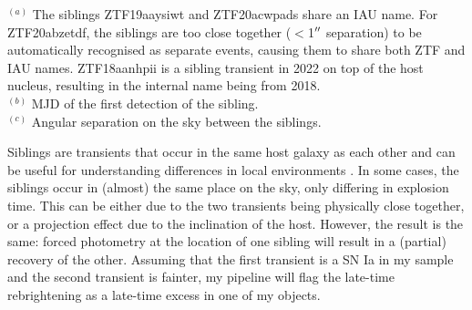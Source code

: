 \documentclass[a4paper,oneside,12pt, class=Latex/Classes/PhDthesisPSnPDF, crop=false]{standalone}
\begin{document}
\begin{table}
 \centering
 \caption{Objects with a detected sibling transient.}
 \begin{flushleft}
$^{(a)}$ The siblings ZTF19aaysiwt and ZTF20acwpads share an IAU name. For ZTF20abzetdf, the siblings are too close together ($<$1$^{\prime\prime}$ separation) to be automatically recognised as separate events, causing them to share both ZTF and IAU names. ZTF18aanhpii is a sibling transient in 2022 on top of the host nucleus, resulting in the internal name being from 2018. \\
$^{(b)}$ MJD of the first detection of the sibling. \\
$^{(c)}$ Angular separation on the sky between the siblings. \\
\end{flushleft} 
 \label{tab:siblings}
\end{table}


Siblings are transients that occur in the same host galaxy as each other and can be useful for understanding differences in local environments \citep[e.g.][]{biswas_siblings, ZTF_siblings}. In some cases, the siblings occur in (almost) the same place on the sky, only differing in explosion time. This can be either due to the two transients being physically close together, or a projection effect due to the inclination of the host. However, the result is the same: forced photometry at the location of one sibling will result in a (partial) recovery of the other. Assuming that the first transient is a SN Ia in my sample and the second transient is fainter, my pipeline will flag the late-time rebrightening as a late-time excess in one of my objects.
\end{document}
